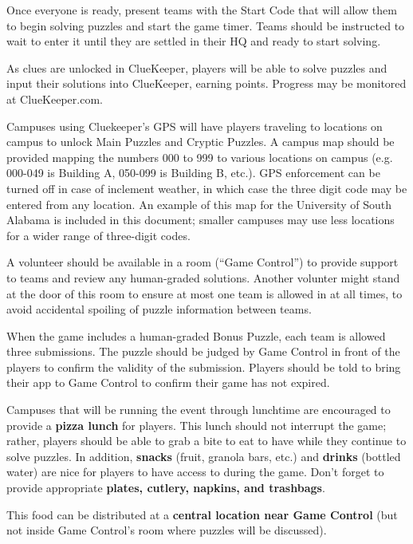 Once everyone is ready, present teams with the Start Code that will allow them
to begin solving puzzles and start the game timer. Teams should be instructed
to wait to enter it until they are settled in their HQ and ready to start solving.


As clues are unlocked in ClueKeeper, players will be able to solve puzzles
and input their solutions into ClueKeeper, earning points. Progress
may be monitored at ClueKeeper.com.

Campuses using Cluekeeper's GPS will have players traveling to locations
on campus to unlock Main Puzzles and Cryptic Puzzles. A campus map should
be provided mapping the numbers 000 to 999 to various locations on campus
(e.g. 000-049 is Building A, 050-099 is Building B, etc.). 
GPS enforcement can be turned off in case of inclement
weather, in which case the
three digit code may be entered from any location. An example of this map
for the University of South Alabama is included in this document; smaller
campuses may use less locations for a wider range of three-digit codes.

A volunteer should be available in a room (``Game Control'') to
provide support to teams and review any human-graded solutions.
Another volunter might stand at the door of this room to ensure at most
one team is allowed in at all times, to avoid accidental
spoiling of puzzle information between teams.

When the game includes a human-graded Bonus Puzzle,
each team is allowed three submissions.
The puzzle should be judged by Game Control in front of the players to confirm
the validity of the submission.
Players should be told to bring their app to Game Control to confirm their
game has not expired.


Campuses that will be running the event through lunchtime are encouraged to
provide a \textbf{pizza lunch} for players. This lunch should not interrupt the
game; rather, players should be able to grab a bite to eat to have while they
continue to solve puzzles. In addition, \textbf{snacks}
(fruit, granola bars, etc.) and \textbf{drinks} (bottled water) are nice for
players to have access to during the game. Don't forget to provide
appropriate \textbf{plates, cutlery, napkins, and trashbags}.

This food can be distributed at a \textbf{central location near Game Control}
(but not inside Game Control's room where puzzles will be discussed).

